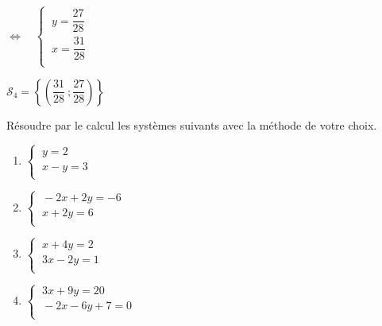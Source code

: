 \documentclass[a4paper,11pt,exos]{nsi} %
\begin{document}
\begin{enumerate}
\begin{tabbing}
                \>  $\iff\quad \left\{
                    \begin{array}{l}
                    \ y=\dfrac{27}{28} \\[.5em]
                    \ x=\dfrac{31}{28}\\
                \end{array} \right.$\\[.5em]
            \end{tabbing}
            $\mathcal{S}_4=\left\{\left(\dfrac{31}{28}\ ;\dfrac{27}{28}\right)\right\}$
\end{enumerate}


\begin{exercice}[ ]
	Résoudre par le calcul les systèmes suivants avec la méthode de votre choix.
	\begin{multicols}{2}
		\begin{enumerate}
			\item 	$\left\{
			\begin{array}{l}
				\ y=2 \\
				\ x-y=3 \\
			\end{array} \right.$
			\item 	$\left\{
			\begin{array}{l}
				\ -2x+2y=-6 \\
				\ x+2y=6 \\
			\end{array} \right.$	
			\item 	$\left\{
			\begin{array}{l}
				\ x+4y=2 \\
				\ 3x-2y=1 \\
			\end{array} \right.$
			\item 	$\left\{
			\begin{array}{l}
				\ 3x+9y=20 \\
				\ -2x-6y+7=0 \\
			\end{array} \right.$
		\end{enumerate}
	\end{multicols}
\end{exercice}
\end{document}

